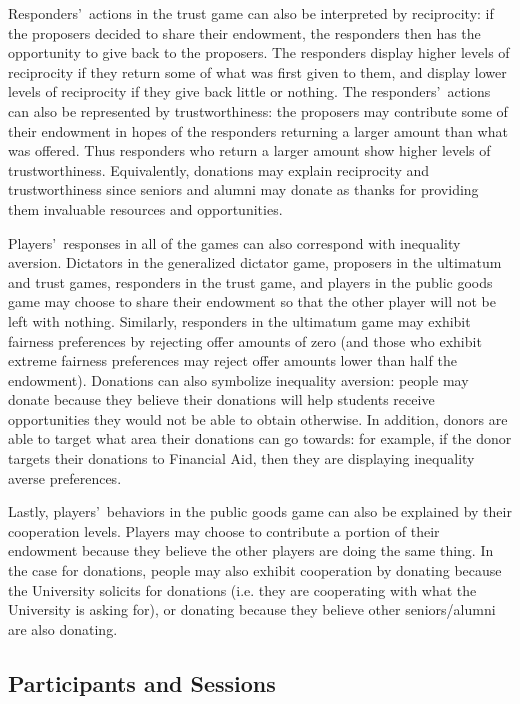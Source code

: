 \documentclass[12pt]{article}
\begin{document}
Responders\rq \ actions in the trust game can also be interpreted by reciprocity: if the proposers decided to share their endowment, the responders then has the opportunity to give back to the proposers. The responders display higher levels of reciprocity if they return some of what was first given to them, and display lower levels of reciprocity if they give back little or nothing. The responders\rq \ actions can also be represented by trustworthiness: the proposers may contribute some of their endowment in hopes of the responders returning a larger amount than what was offered. Thus responders who return a larger amount show higher levels of trustworthiness. Equivalently, donations may explain reciprocity and trustworthiness since seniors and alumni may donate as thanks for providing them invaluable resources and opportunities.

Players\rq \ responses in all of the games can also correspond with inequality aversion. Dictators in the generalized dictator game, proposers in the ultimatum and trust games, responders in the trust game, and players in the public goods game may choose to share their endowment so that the other player will not be left with nothing. Similarly, responders in the ultimatum game may exhibit fairness preferences by rejecting offer amounts of zero (and those who exhibit extreme fairness preferences may reject offer amounts lower than half the endowment). Donations can also symbolize inequality aversion: people may donate because they believe their donations will help students receive opportunities they would not be able to obtain otherwise. In addition, donors are able to target what area their donations can go towards: for example, if the donor targets their donations to Financial Aid, then they are displaying inequality averse preferences.

Lastly, players\rq \ behaviors in the public goods game can also be explained by their cooperation levels. Players may choose to contribute a portion of their endowment because they believe the other players are doing the same thing. In the case for donations, people may also exhibit cooperation by donating because the University solicits for donations (i.e. they are cooperating with what the University is asking for), or donating because they believe other seniors/alumni are also donating.

	
\subsection{Participants and Sessions}
\end{document}

